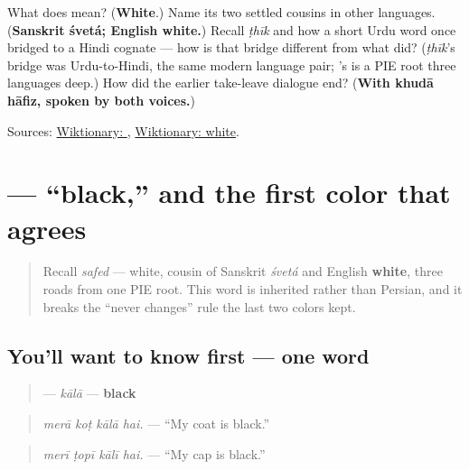 \begin{tcolorbox}[breakable,colback=teal!4,colframe=teal!35!black,title={Before you move on}]
What does \textbf{} mean? (\textbf{White}.) Name its two settled cousins in other languages. (\textbf{Sanskrit śvetá; English white.}) Recall \emph{ṭhīk} and how a short Urdu word once bridged to a Hindi cognate — how is that bridge different from what \textbf{} did? (\emph{ṭhīk}'s bridge was Urdu-to-Hindi, the same modern language pair; \textbf{}'s is a PIE root three languages deep.) How did the earlier take-leave dialogue end? (\textbf{With khudā hāfiz, spoken by both voices.})

Sources: \href{https://en.wiktionary.org/wiki/\%D8\%B3\%D9\%81\%DB\%8C\%D8\%AF}{Wiktionary: }, \href{https://en.wiktionary.org/wiki/white}{Wiktionary: white}.
\end{tcolorbox}
\section[\texorpdfstring{\ur{کالا} (kālā)}{کالا (kālā)}]{ — \textquotedblleft{}black,\textquotedblright{} and the first color that agrees}

\label{lesson:UR-C13-kala}



\begin{quote}
Recall \emph{safed} — white, cousin of Sanskrit \emph{śvetá} and English \textbf{white}, three roads from one PIE root. This word is inherited rather than Persian, and it breaks the \textquotedblleft{}never changes\textquotedblright{} rule the last two colors kept.
\end{quote}

\subsection*{You'll want to know first — one word}
\begin{quote}
\textbf{} — \emph{kālā} — \textbf{black}
\end{quote}

\begin{quote}
\emph{merā koṭ kālā hai.} — \textquotedblleft{}My coat is black.\textquotedblright{}
\end{quote}

\begin{quote}
\emph{merī ṭopī kālī hai.} — \textquotedblleft{}My cap is black.\textquotedblright{}
\end{quote}

